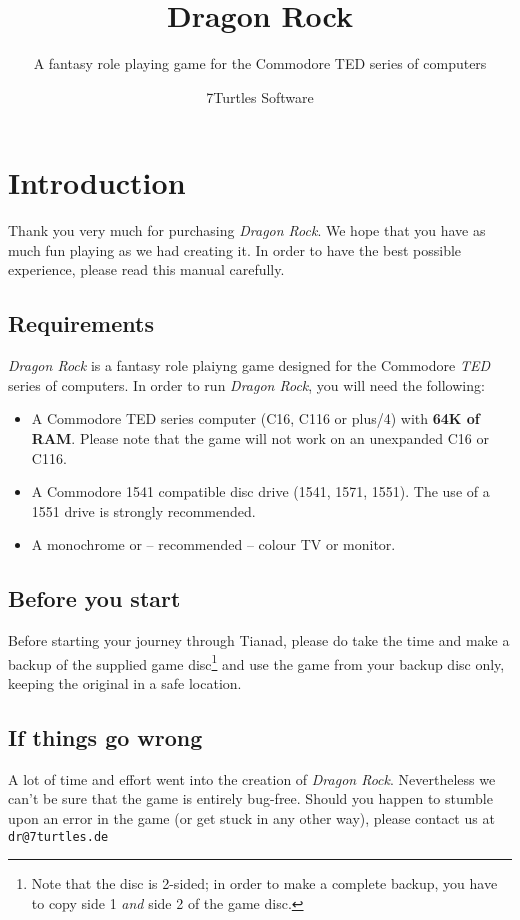 \documentclass[12pt]{scrbook}
\begin{document}
\title{Dragon Rock}
\subtitle{A fantasy role playing game for the Commodore TED series of computers}
\author{7Turtles Software}

\maketitle

\chapter*{Introduction}
Thank you very much for purchasing \textit{Dragon Rock}. We hope that you have as much fun playing as we had creating it. In order to have the best possible experience, please read this manual carefully.

\section*{Requirements}
\textit{Dragon Rock} is a fantasy role plaiyng game designed for the Commodore \textit{TED} series of computers. In order to run \textit{Dragon Rock}, you will need the following:
\begin{itemize}
    \item A Commodore TED series computer (C16, C116 or plus/4) with \textbf{64K of RAM}. Please note that the game will not work on an unexpanded C16 or C116.
    \item A Commodore 1541 compatible disc drive (1541, 1571, 1551). The use of a 1551 drive is strongly recommended. 
    \item A monochrome or -- recommended -- colour TV or monitor.
\end{itemize}

\section*{Before you start}
Before starting your journey through Tianad, please do take the time and make a backup of the supplied game disc\footnote{Note that the disc is 2-sided; in order to make a complete backup, you have to copy side 1 \textit{and} side 2 of the game disc.} and use the game from your backup disc only, keeping the original in a safe location. 

\section*{If things go wrong}
A lot of time and effort went into the creation of \textit{Dragon Rock}. Nevertheless we can't be sure that the game is entirely bug-free. Should you happen to stumble upon an error in the game (or get stuck in any other way), please contact us at \texttt{dr@7turtles.de}
\end{document}
